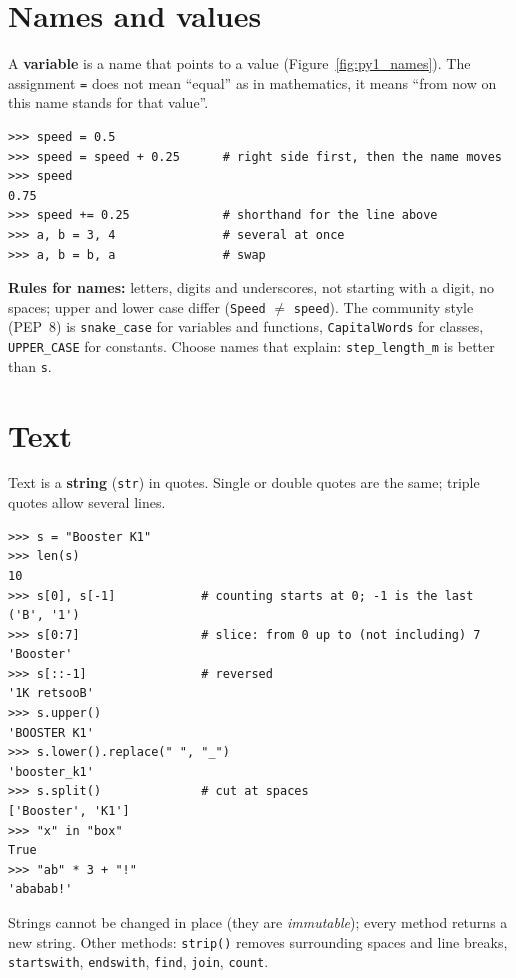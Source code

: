 \section*{Names and values}
A \textbf{variable} is a name that points to a value (Figure~\ref{fig:py1_names}). The assignment \texttt{=} does not mean ``equal'' as in mathematics, it means ``from now on this name stands for that value''.
\begin{verbatim}
>>> speed = 0.5
>>> speed = speed + 0.25      # right side first, then the name moves
>>> speed
0.75
>>> speed += 0.25             # shorthand for the line above
>>> a, b = 3, 4               # several at once
>>> a, b = b, a               # swap
\end{verbatim}
\begin{center}
\label{fig:py1_names}
\end{center}
\textbf{Rules for names:} letters, digits and underscores, not starting with a digit, no spaces; upper and lower case differ (\texttt{Speed} $\neq$ \texttt{speed}). The community style (PEP~8) is \texttt{snake\_case} for variables and functions, \texttt{CapitalWords} for classes, \texttt{UPPER\_CASE} for constants. Choose names that explain: \texttt{step\_length\_m} is better than \texttt{s}.

\section*{Text}
Text is a \textbf{string} (\texttt{str}) in quotes. Single or double quotes are the same; triple quotes allow several lines.
\begin{verbatim}
>>> s = "Booster K1"
>>> len(s)
10
>>> s[0], s[-1]            # counting starts at 0; -1 is the last
('B', '1')
>>> s[0:7]                 # slice: from 0 up to (not including) 7
'Booster'
>>> s[::-1]                # reversed
'1K retsooB'
>>> s.upper()
'BOOSTER K1'
>>> s.lower().replace(" ", "_")
'booster_k1'
>>> s.split()              # cut at spaces
['Booster', 'K1']
>>> "x" in "box"
True
>>> "ab" * 3 + "!"
'ababab!'
\end{verbatim}
Strings cannot be changed in place (they are \emph{immutable}); every method returns a new string. Other methods: \texttt{strip()} removes surrounding spaces and line breaks, \texttt{startswith}, \texttt{endswith}, \texttt{find}, \texttt{join}, \texttt{count}.

